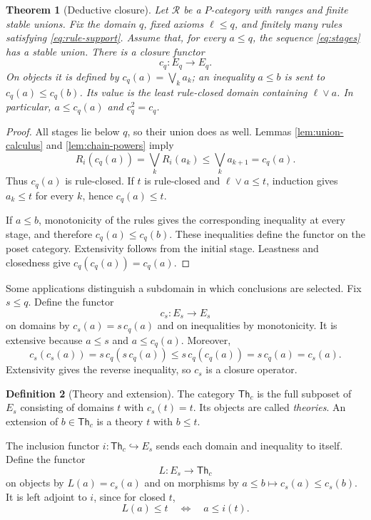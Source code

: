\documentclass[11pt]{article}
\newtheorem{theorem}{Theorem}[section]
\theoremstyle{definition}
\newtheorem{definition}[theorem]{Definition}
\newcommand{\R}{\mathscr R}
\newcommand{\Th}{\mathsf{Th}}
\begin{document}
\begin{theorem}[Deductive closure]\label{thm:closure}
Let $\R$ be a $P$-category with ranges and finite stable unions. Fix the
domain $q$, fixed axioms $\ell\le q$, and finitely many rules satisfying
\eqref{eq:rule-support}. Assume that, for every $a\le q$, the sequence
\eqref{eq:stages} has a stable union. There is a closure functor
\[
 c_q:E_q\longrightarrow E_q.
\]
On objects it is defined by $c_q(a)=\bigvee_k a_k$; an inequality $a\le b$
is sent to $c_q(a)\le c_q(b)$. Its value is the least rule-closed domain
containing $\ell\vee a$. In particular, $a\le c_q(a)$ and $c_q^2=c_q$.
\end{theorem}
\begin{proof}
All stages lie below $q$, so their union does as well. Lemmas
\ref{lem:union-calculus} and \ref{lem:chain-powers} imply
\[
 R_i(c_q(a))=\bigvee_k R_i(a_k)
 \le\bigvee_k a_{k+1}=c_q(a).
\]
Thus $c_q(a)$ is rule-closed. If $t$ is rule-closed and $\ell\vee a\le t$,
induction gives $a_k\le t$ for every $k$, hence $c_q(a)\le t$.

If $a\le b$, monotonicity of the rules gives the corresponding inequality
at every stage, and therefore $c_q(a)\le c_q(b)$. These inequalities define
the functor on the poset category. Extensivity follows from the initial
stage. Leastness and closedness give $c_q(c_q(a))=c_q(a)$.
\end{proof}

Some applications distinguish a subdomain in which conclusions are selected.
Fix $s\le q$. Define the functor
\[
 c_s:E_s\longrightarrow E_s
\]
on domains by $c_s(a)=s\,c_q(a)$ and on inequalities by monotonicity.
It is extensive because $a\le s$ and $a\le c_q(a)$. Moreover,
\[
 c_s(c_s(a))=s\,c_q(s\,c_q(a))
 \le s\,c_q(c_q(a))=s\,c_q(a)=c_s(a).
\]
Extensivity gives the reverse inequality, so $c_s$ is a closure operator.

\begin{definition}[Theory and extension]\label{def:theory}
The category $\Th_c$ is the full subposet of $E_s$ consisting of domains
$t$ with $c_s(t)=t$. Its objects are called \emph{theories}. An extension
of $b\in\Th_c$ is a theory $t$ with $b\le t$.
\end{definition}

The inclusion functor $i:\Th_c\hookrightarrow E_s$ sends each domain and
inequality to itself. Define the functor
\[
 L:E_s\longrightarrow\Th_c
\]
on objects by $L(a)=c_s(a)$ and on morphisms by $a\le b\mapsto c_s(a)\le c_s(b)$.
It is left adjoint to $i$, since for closed $t$,
\begin{equation}\label{eq:reflection}
 L(a)\le t\quad\Longleftrightarrow\quad a\le i(t).
\end{equation}
\end{document}
